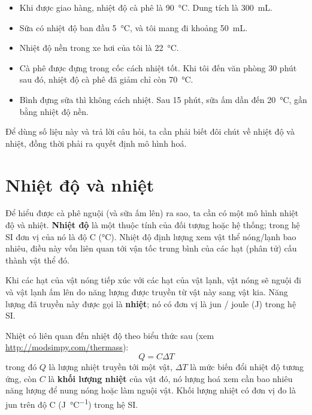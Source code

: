\documentclass[12pt]{book}
\theoremstyle{exercise}
\begin{document}
\begin{itemize}

\item Khi được giao hàng, nhiệt độ cà phê là \SI{90}{\celsius}.  Dung tích là \SI{300}{mL}.

\item Sữa có nhiệt độ ban đầu \SI{5}{\celsius}, và tôi mang đi khoảng \SI{50}{mL}.

\item Nhiệt độ nền trong xe hơi của tôi là \SI{22}{\celsius}.

\item Cà phê được đựng trong cốc cách nhiệt tốt. Khi tôi đến văn phòng 30 phút sau đó, nhiệt độ cà phê đã giảm chỉ còn \SI{70}{\celsius}.

\item Bình đựng sữa thì không cách nhiệt. Sau 15 phút, sữa ấm dần đến \SI{20}{\celsius}, gần bằng nhiệt độ nền.

\end{itemize}

Để dùng số liệu này và trả lời câu hỏi, ta cần phải biết đôi chút về nhiệt độ và nhiệt, đồng thời phải ra quyết định mô hình hoá.


\section{Nhiệt độ và nhiệt}

Để hiểu được cà phê nguội (và sữa ấm lên) ra sao, ta cần có một mô hình nhiệt độ và nhiệt.  {\bf Nhiệt độ} là một thuộc tính của đối tượng hoặc hệ thống; trong hệ SI đơn vị của nó là độ C (\si{\celsius}).  Nhiệt độ định lượng xem vật thể nóng/lạnh bao nhiêu, điều này vốn liên quan tới vận tốc trung bình của các hạt (phân tử) cấu thành vật thể đó.


Khi các hạt của vật nóng tiếp xúc với các hạt của vật lạnh, vật nóng sẽ nguội đi và vật lạnh ấm lên do năng lượng được truyền từ vật này sang vật kia. Năng lượng đã truyền này được gọi là {\bf nhiệt}; nó có đơn vị là jun / joule (\si{\joule}) trong hệ SI.


Nhiệt có liên quan đến nhiệt độ theo biểu thức sau (xem \url{http://modsimpy.com/thermass}):
%
\[ Q = C \Delta T \]
%
trong đó $Q$ là lượng nhiệt truyền tới một vật, $\Delta T$ là mức biến đổi nhiệt độ tương ứng, còn $C$ là {\bf khối lượng nhiệt} của vật đó, nó lượng hoá xem cần bao nhiêu năng lượng để nung nóng hoặc làm nguội vật. Khối lượng nhiệt có đơn vị đo là jun trên độ C (\si{\joule\per\celsius}) trong hệ SI.
\end{document}

